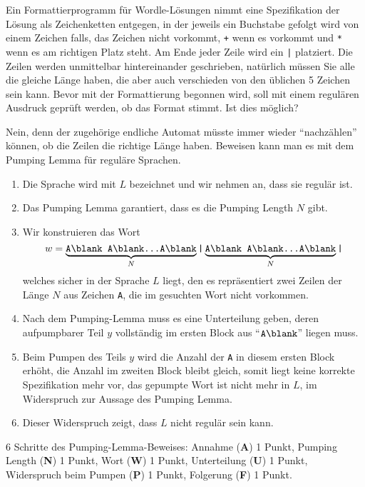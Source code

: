 Ein Formattierprogramm für Wordle-Lösungen nimmt eine Spezifikation
der Lösung als Zeichenketten entgegen, in der jeweils ein Buchstabe
gefolgt wird von einem Zeichen {\blank} falls, das Zeichen nicht 
vorkommt, \texttt{+} wenn es vorkommt und \texttt{*} wenn es am richtigen
Platz steht.
Am Ende jeder Zeile wird ein \texttt{|} platziert.
Die Zeilen werden unmittelbar hintereinander geschrieben, natürlich
müssen Sie alle die gleiche Länge haben, die aber auch verschieden
von den üblichen 5 Zeichen sein kann.
Bevor mit der Formattierung begonnen wird, soll mit einem regulären
Ausdruck geprüft werden, ob das Format stimmt.
Ist dies möglich?


\begin{loesung}
Nein, denn der zugehörige endliche Automat müsste immer wieder ``nachzählen''
können, ob die Zeilen die richtige Länge haben.
Beweisen kann man es mit dem Pumping Lemma für reguläre Sprachen.
\begin{enumerate}
\item Die Sprache wird mit $L$ bezeichnet und wir nehmen an, dass sie
regulär ist.
\item
Das Pumping Lemma garantiert, dass es die Pumping Length $N$ gibt.
\item
Wir konstruieren das Wort
\begin{equation*}
w
=
\underbrace{\texttt{A\blank A\blank\dots A\blank}}_N\texttt{|}%
\underbrace{\texttt{A\blank A\blank\dots A\blank}}_N\texttt{|}
\end{equation*}
welches sicher in der Sprache $L$ liegt,
den es repräsentiert zwei Zeilen der Länge $N$ aus Zeichen \texttt{A},
die im gesuchten Wort nicht vorkommen.
\item
Nach dem Pumping-Lemma muss es eine Unterteilung geben, deren
aufpumpbarer Teil $y$ vollständig im ersten Block aus
``$\texttt{A\blank}$'' liegen muss.
\item
Beim Pumpen des Teils $y$ wird die Anzahl der \texttt{A} in diesem
ersten Block erhöht, die Anzahl im zweiten Block bleibt gleich, somit
liegt keine korrekte Spezifikation mehr vor, das gepumpte Wort ist
nicht mehr in $L$, im Widerspruch zur Aussage des Pumping Lemma.
\item
Dieser Widerspruch zeigt, dass $L$ nicht regulär sein kann.
\qedhere
\end{enumerate}
\end{loesung}

\begin{bewertung}
6 Schritte des Pumping-Lemma-Beweises:
Annahme ({\bf A}) 1 Punkt,
Pumping Length ({\bf N}) 1 Punkt,
Wort ({\bf W}) 1 Punkt,
Unterteilung ({\bf U}) 1 Punkt,
Widerspruch beim Pumpen ({\bf P}) 1 Punkt,
Folgerung ({\bf F}) 1 Punkt.
\end{bewertung}
